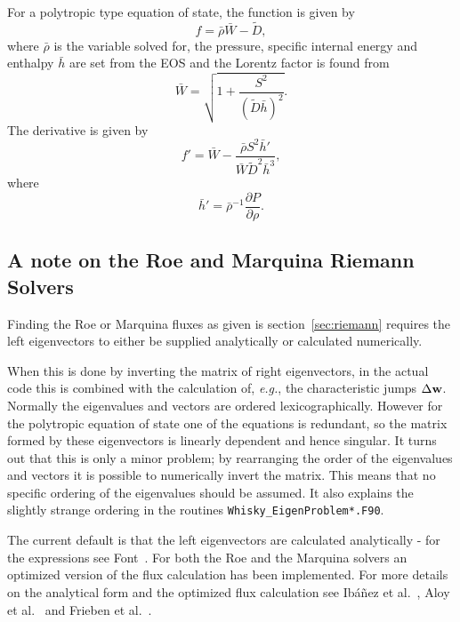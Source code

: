 \documentclass{article}
\begin{document}
For a polytropic type equation of state, the function is given by
\begin{equation}
  \label{eq:polyf}
  f = \bar{\rho}\bar{W} - \tilde{D},
\end{equation}
where $\bar{\rho}$ is the variable solved for, the pressure, specific
internal energy and enthalpy $\bar{h}$ are set from the EOS and the
Lorentz factor is found from
\begin{equation}
  \label{eq:polyw}
  \bar{W} = \sqrt{1 + \frac{S^2}{(\tilde{D}\bar{h})^2}}.
\end{equation}
The derivative is given by
\begin{equation}
  \label{eq:dpolyf}
  f' = \bar{W} - \frac{\bar{\rho}S^2 \bar{h}'}{\bar{W} \tilde{D}^2
  \bar{h}^3}, 
\end{equation}
where
\begin{equation}
  \label{eq:dpolyenth}
  \bar{h}' = \bar{\rho}^{-1}\frac{\partial P}{\partial \rho}.
\end{equation}

\subsection{A note on the Roe and Marquina Riemann Solvers}
\label{sec:rsnote}

Finding the Roe or Marquina fluxes as given is
section~\ref{sec:riemann} requires the left eigenvectors to either be
supplied analytically or calculated numerically. 

When this is done by inverting the matrix of right
eigenvectors, in the actual code this is combined with the calculation
of, {\it e.g.}, the characteristic jumps $\Delta {\bf w}$.
Normally the eigenvalues and vectors are ordered lexicographically.
However for the polytropic equation of state one of the equations is
redundant, so the matrix formed by these eigenvectors is linearly
dependent and hence singular. It turns out that this is only a minor
problem; by rearranging the order of the eigenvalues and vectors it is
possible to numerically invert the matrix. 
This means that no specific ordering of the eigenvalues should be
assumed. It also explains the slightly strange ordering in the
routines {\tt Whisky\_EigenProblem*.F90}.

The current default is that the left eigenvectors are calculated
analytically - for the expressions see Font~\cite{livrevgrrfd}. For
both the Roe and the Marquina solvers an optimized version of the flux
calculation has been implemented. For more details on the analytical
form and the optimized flux calculation see Ib{\'a}{\~n}ez et
al.~\cite{Iban01}, Aloy et al.~\cite{Aloy99} and Frieben et
al.~\cite{Frie02}.
\end{document}
